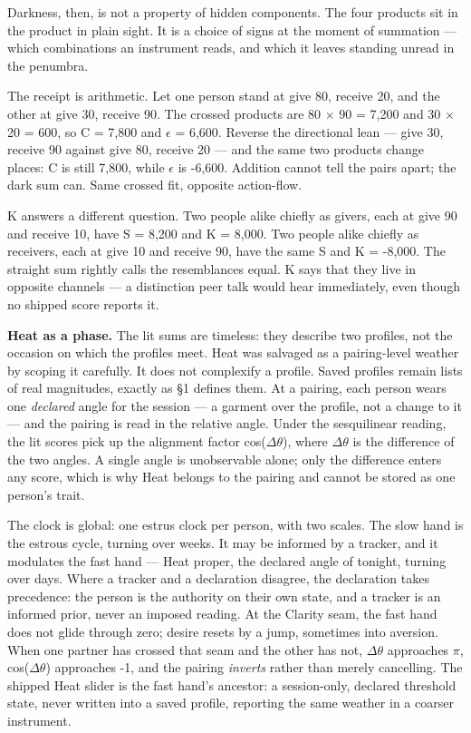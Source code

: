 Darkness, then, is not a property of hidden components. The four
products sit in the product in plain sight. It is a choice of signs at
the moment of summation --- which combinations an instrument reads, and
which it leaves standing unread in the penumbra.

The receipt is arithmetic. Let one person stand at give 80, receive 20,
and the other at give 30, receive 90. The crossed products are 80 $\times$ 90 =
7,200 and 30 $\times$ 20 = 600, so C = 7,800 and $\epsilon$ = 6,600. Reverse the
directional lean --- give 30, receive 90 against give 80, receive 20 ---
and the same two products change places: C is still 7,800, while $\epsilon$ is
-6,600. Addition cannot tell the pairs apart; the dark sum can. Same
crossed fit, opposite action-flow.

K answers a different question. Two people alike chiefly as givers, each
at give 90 and receive 10, have S = 8,200 and K = 8,000. Two people
alike chiefly as receivers, each at give 10 and receive 90, have the
same S and K = -8,000. The straight sum rightly calls the resemblances
equal. K says that they live in opposite channels --- a distinction peer
talk would hear immediately, even though no shipped score reports it.

\textbf{Heat as a phase.} The lit sums are timeless: they describe two
profiles, not the occasion on which the profiles meet. Heat was salvaged
as a pairing-level weather by scoping it carefully. It does not
complexify a profile. Saved profiles remain lists of real magnitudes,
exactly as \S 1 defines them. At a pairing, each person wears one
\emph{declared} angle for the session --- a garment over the profile,
not a change to it --- and the pairing is read in the relative angle.
Under the sesquilinear reading, the lit scores pick up the alignment
factor cos($\Delta$$\theta$), where $\Delta$$\theta$ is the difference of the two angles. A single
angle is unobservable alone; only the difference enters any score, which
is why Heat belongs to the pairing and cannot be stored as one person's
trait.

The clock is global: one estrus clock per person, with two scales. The
slow hand is the estrous cycle, turning over weeks. It may be informed
by a tracker, and it modulates the fast hand --- Heat proper, the
declared angle of tonight, turning over days. Where a tracker and a
declaration disagree, the declaration takes precedence: the person is
the authority on their own state, and a tracker is an informed prior,
never an imposed reading. At the Clarity seam, the fast hand does not
glide through zero; desire resets by a jump, sometimes into aversion.
When one partner has crossed that seam and the other has not, $\Delta$$\theta$
approaches $\pi$, cos($\Delta$$\theta$) approaches -1, and the pairing \emph{inverts}
rather than merely cancelling. The shipped Heat slider is the fast
hand's ancestor: a session-only, declared threshold state, never written
into a saved profile, reporting the same weather in a coarser
instrument.

